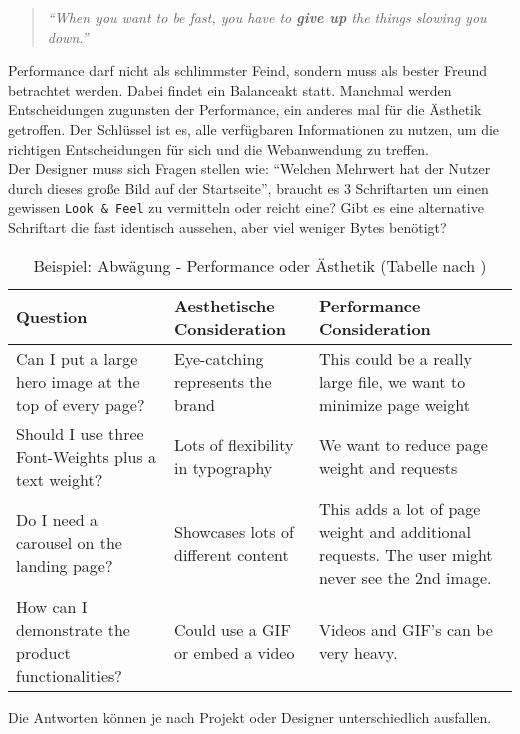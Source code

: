 			\begin{quote}
				\textit{"`When you want to be fast, you have to \textbf{give up} the things slowing you down."'}\autocite[p. 2]{osmani14}
			\end{quote}

			Performance darf nicht als schlimmster Feind, sondern muss als bester Freund betrachtet werden. Dabei findet ein Balanceakt statt. Manchmal werden Entscheidungen zugunsten der Performance, ein anderes mal für die Ästhetik getroffen. Der Schlüssel ist es, alle verfügbaren Informationen zu nutzen, um die richtigen Entscheidungen für sich und die Webanwendung zu treffen.\autocite[p. 126]{laraHogan14}\\
			Der Designer muss sich Fragen stellen wie: "`Welchen Mehrwert hat der Nutzer durch dieses große Bild auf der Startseite"', braucht es 3 Schriftarten um einen gewissen \texttt{Look \& Feel} zu vermitteln oder reicht eine? Gibt es eine alternative Schriftart die fast identisch aussehen, aber viel weniger Bytes benötigt? 

			\begin{longtable}{|>{\raggedright \arraybackslash}p{4.9cm}|>{\raggedright \arraybackslash}p{4.9cm}|>{\raggedright \arraybackslash}p{5cm}|}
			\caption{Beispiel: Abwägung - Performance oder Ästhetik  (Tabelle nach \autocite[p. 126]{laraHogan14})}\\
			\hline
				\textbf{Question} & \textbf{Aesthetische Consideration} & \textbf{Performance Consideration}\\
				\hline
				Can I put a large hero image at the top of every page? & Eye-catching represents the brand & This could be a really large file, we want to minimize page weight\\
				\hline
				Should I use three Font-Weights plus a text weight? & Lots of flexibility in typography & We want to reduce page weight and requests\\
				\hline
				Do I need a carousel on the landing page? & Showcases lots of different content & This adds a lot of page weight and additional requests. The user might never see the 2nd image.\\
				\hline
				How can I demonstrate the product functionalities? & Could use a GIF or embed a video & Videos and GIF's can be very heavy.\\
				\hline
			\end{longtable}

			Die Antworten können je nach Projekt oder Designer unterschiedlich ausfallen.


